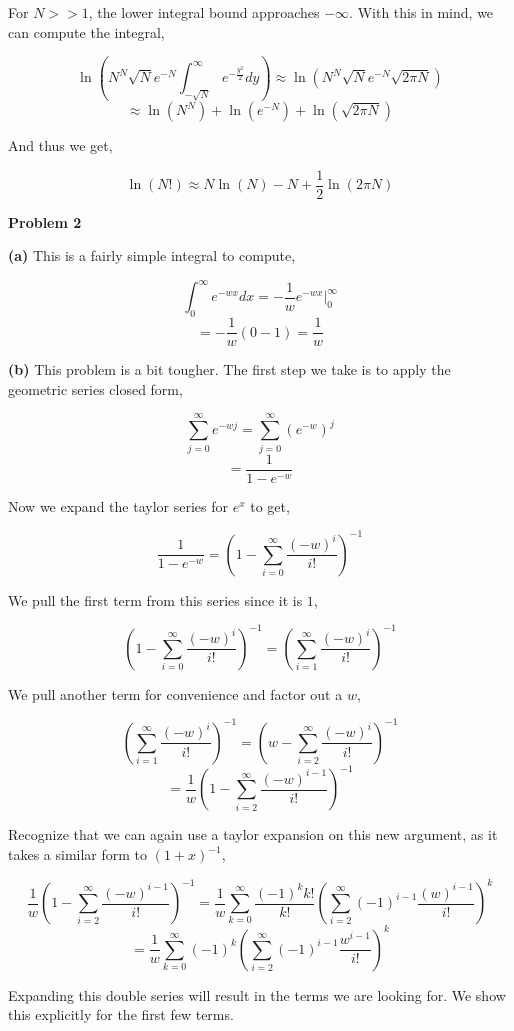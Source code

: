 \documentclass[11pt]{article}
\begin{document}
For $N >> 1$, the lower integral bound approaches $-\infty$. With this in mind, we can compute the integral,

$$ \ln(N^{N}\sqrt{N}e^{-N} \int_{-\sqrt{N}}^{\infty} e^{- \frac{y^{2}}{2}}dy) \approx \ln(N^{N}\sqrt{N}e^{-N} \sqrt{2\pi N})$$
$$ \approx \ln(N^{N}) + \ln(e^{-N}) + \ln(\sqrt{2\pi N})$$

And thus we get,

$$\ln(N!) \approx N\ln(N) - N + \frac{1}{2}\ln(2\pi N)$$

\newpage

\textbf{Problem 2}

\textbf{(a)} This is a fairly simple integral to compute,

$$\int_{0}^{\infty} e^{-wx}dx = -\frac{1}{w}e^{-wx}  \bigg\rvert_{0}^{\infty} $$
$$ = -\frac{1}{w} (0 - 1) = \frac{1}{w} $$

\textbf{(b)} This problem is a bit tougher. The first step we take is to apply the geometric series closed form, 

$$\sum_{j=0}^{\infty} e^{-wj} = \sum_{j=0}^{\infty}\left(e^{-w}\right)^{j}$$
$$ = \frac{1}{1-e^{-w}} $$

Now we expand the taylor series for $e^{x}$ to get,

$$\frac{1}{1-e^{-w}} = \left(1 - \sum_{i=0}^{\infty}\frac{(-w)^{i}}{i!} \right)^{-1}$$

We pull the first term from this series since it is $1$,

$$ \left(1 - \sum_{i=0}^{\infty}\frac{(-w)^{i}}{i!} \right)^{-1} =  \left(\sum_{i=1}^{\infty}\frac{(-w)^{i}}{i!} \right)^{-1}$$

We pull another term for convenience and factor out a $w$,

$$\left(\sum_{i=1}^{\infty}\frac{(-w)^{i}}{i!} \right)^{-1} = \left(w - \sum_{i=2}^{\infty}\frac{(-w)^{i}}{i!} \right)^{-1}$$
$$= \frac{1}{w} \left(1 - \sum_{i=2}^{\infty}\frac{(-w)^{i-1}}{i!} \right)^{-1}$$

Recognize that we can again use a taylor expansion on this new argument, as it takes a similar form to $(1+x)^{-1}$,

$$ \frac{1}{w} \left(1 - \sum_{i=2}^{\infty}\frac{(-w)^{i-1}}{i!} \right)^{-1} = \frac{1}{w} \sum_{k=0}^{\infty} \frac{(-1)^{k}k!}{k!}\left(\sum_{i=2}^{\infty}(-1)^{i-1}\frac{(w)^{i-1}}{i!}\right)^{k}$$
$$ = \frac{1}{w}\sum_{k=0}^{\infty}(-1)^{k}\left(\sum_{i=2}^{\infty}(-1)^{i-1}\frac{w^{i-1}}{i!}\right)^{k}$$

Expanding this double series will result in the terms we are looking for. We show this explicitly for the first few terms.
\end{document}
